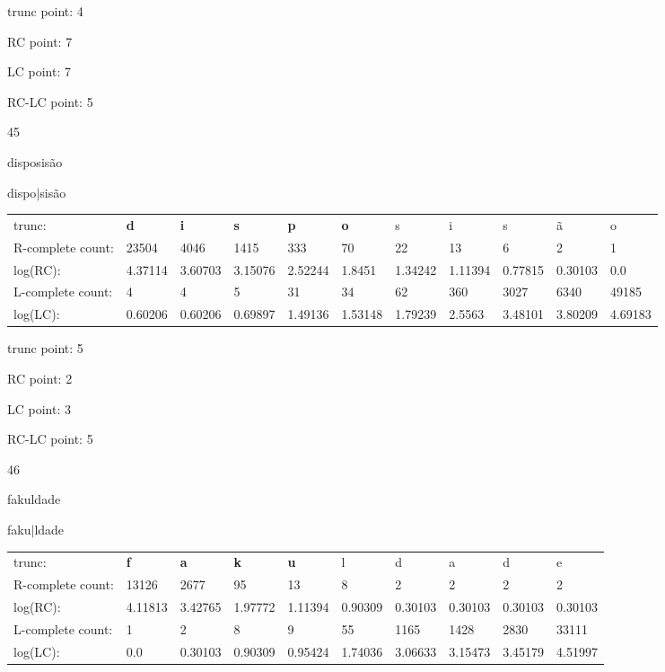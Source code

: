 \documentclass{article}
\begin{document}
trunc point: 4

RC point: 7

LC point: 7

RC-LC point: 5

\vspace{3em}



45

disposisão

dispo$|$sisão

\vspace{1em}

\begin{tabular}{l|llllllllll}

trunc: & {\color{red}\bf d} & {\color{red}\bf i} & {\color{red}\bf s} & {\color{red}\bf p} & {\color{red}\bf o} & s & i & s & ã & o \\ 
R-complete count: & 23504 & 4046 & 1415 & 333 & 70 & 22 & 13 & 6 & 2 & 1 \\ 
log(RC): & 4.37114 & 3.60703 & 3.15076 & 2.52244 & 1.8451 & 1.34242 & 1.11394 & 0.77815 & 0.30103 & 0.0 \\ 
L-complete count: & 4 & 4 & 5 & 31 & 34 & 62 & 360 & 3027 & 6340 & 49185 \\ 
log(LC): & 0.60206 & 0.60206 & 0.69897 & 1.49136 & 1.53148 & 1.79239 & 2.5563 & 3.48101 & 3.80209 & 4.69183 \\ 
\end{tabular}

trunc point: 5

RC point: 2

LC point: 3

RC-LC point: 5

\vspace{3em}



46

fakuldade

faku$|$ldade

\vspace{1em}

\begin{tabular}{l|lllllllll}

trunc: & {\color{red}\bf f} & {\color{red}\bf a} & {\color{red}\bf k} & {\color{red}\bf u} & l & d & a & d & e \\ 
R-complete count: & 13126 & 2677 & 95 & 13 & 8 & 2 & 2 & 2 & 2 \\ 
log(RC): & 4.11813 & 3.42765 & 1.97772 & 1.11394 & 0.90309 & 0.30103 & 0.30103 & 0.30103 & 0.30103 \\ 
L-complete count: & 1 & 2 & 8 & 9 & 55 & 1165 & 1428 & 2830 & 33111 \\ 
log(LC): & 0.0 & 0.30103 & 0.90309 & 0.95424 & 1.74036 & 3.06633 & 3.15473 & 3.45179 & 4.51997 \\ 
\end{tabular}
\end{document}
